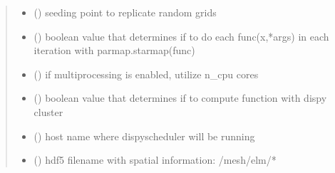 \documentclass[letterpaper,10pt,english,openany,oneside]{sphinxmanual}
\begin{document}
\begin{fulllineitems}
\begin{quote}
\begin{description}
\begin{itemize}
\item {} 
 (\sphinxstyleliteralemphasis{\sphinxupquote{, }}\sphinxstyleliteralemphasis{\sphinxupquote{, }}) \textendash{} seeding point to replicate random grids

\item {} 
 (\sphinxstyleliteralemphasis{\sphinxupquote{, }}\sphinxstyleliteralemphasis{\sphinxupquote{, }}) \textendash{} boolean value that determines if to do each func(x,*args) in each iteration with parmap.starmap(func)

\item {} 
 (\sphinxstyleliteralemphasis{\sphinxupquote{, }}\sphinxstyleliteralemphasis{\sphinxupquote{, }}) \textendash{} if multiprocessing is enabled, utilize n\_cpu cores

\item {} 
 (\sphinxstyleliteralemphasis{\sphinxupquote{, }}\sphinxstyleliteralemphasis{\sphinxupquote{, }}) \textendash{} boolean value that determines if to compute function with dispy cluster

\item {} 
 (\sphinxstyleliteralemphasis{\sphinxupquote{, }}\sphinxstyleliteralemphasis{\sphinxupquote{, }}) \textendash{} host name where dispyscheduler will be running

\item {} 
 (\sphinxstyleliteralemphasis{\sphinxupquote{, }}\sphinxstyleliteralemphasis{\sphinxupquote{, }}) \textendash{} hdf5 filename with spatial information: /mesh/elm/*


\end{itemize}
\end{description}
\end{quote}
\end{fulllineitems}
\end{document}
